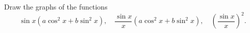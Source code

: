 Draw the graphs of the functions
\[
\sin x(a\cos^{2} x + b\sin^{2} x),\quad
\frac{\sin x}{x}(a\cos^{2} x + b\sin^{2} x),\quad
\left(\frac{\sin x}{x}\right)^{2}.
\]

